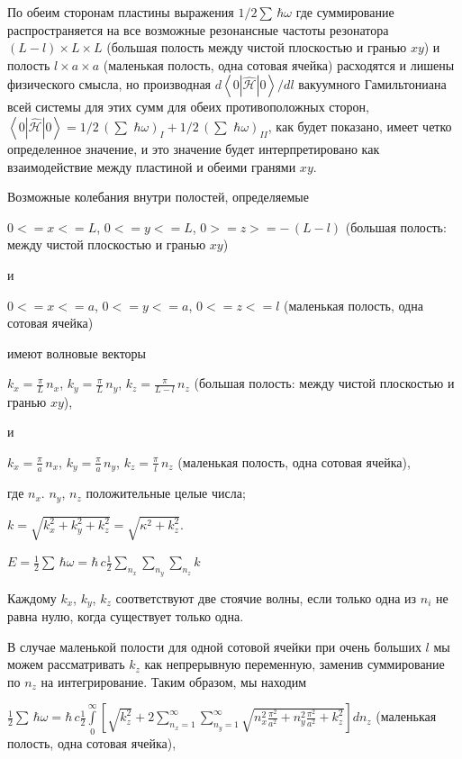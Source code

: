 \documentclass[11pt]{article}
\begin{document}
По обеим сторонам пластины выражения \(1\big/2\sum\,\hbar\omega\) где
суммирование распространяется на все возможные резонансные частоты
резонатора \(\left(L-l\right)\times L\times L\) (большая полость между
чистой плоскостью и гранью \(xy\)) и полость \(l\times a\times a\)
(маленькая полость, одна сотовая ячейка) расходятся и лишены физического
смысла, но производная
\({d\left<0|\hat {\mathcal{H}}|0\right>}\big/{dl}\) вакуумного
Гамильтониана всей системы для этих сумм для обеих противоположных
сторон,
\(\left<0|\hat{\mathcal{H}}|0\right> = 1\big/2\,\left(\sum\,\,\hbar\omega\right)_{I} + 1\big/2\,\left(\sum\,\,\hbar\omega\right)_{II}\),
как будет показано, имеет четко определенное значение, и это значение
будет интерпретировано как взаимодействие между пластиной и обеими
гранями \(xy\).

    Возможные колебания внутри полостей, определяемые

\(0<=x<=L\), \(0<=y<=L\), \(0>=z>=-\,(L-l)\) (большая полость: между
чистой плоскостью и гранью \(xy\))

и

\(0<=x<=a\), \(0<=y<=a\), \(0<=z<=l\) (маленькая полость, одна сотовая
ячейка)

    имеют волновые векторы

\(k_x = \frac{\pi}{L}\,n_x\), \(k_y = \frac{\pi}{L}\,n_y\),
\(k_z = \frac{\pi}{L-l}\,n_z\) (большая полость: между чистой плоскостью
и гранью \(xy\)),

и

\(k_x = \frac{\pi}{a}\,n_x\), \(k_y = \frac{\pi}{a}\,n_y\),
\(k_z = \frac{\pi}{l}\,n_z\) (маленькая полость, одна сотовая ячейка),

где \(n_x\). \(n_y\), \(n_z\) положительные целые числа;

\(k = \sqrt{k_x^2+k_y^2+k_z^2} = \sqrt{\kappa^2+k_z^2}\).

\(E = \frac{1}{2}\sum\,\hbar\omega = \hbar\,c\frac{1}{2}\sum\limits_{n_x}^{}\sum\limits_{n_y}^{}\sum\limits_{n_z}^{}k\)

    Каждому \(k_x\), \(k_y\), \(k_z\) соответствуют две стоячие волны, если
только одна из \(n_i\) не равна нулю, когда существует только одна.

В случае маленькой полости для одной сотовой ячейки при очень больших
\(l\) мы можем рассматривать \(k_z\) как непрерывную переменную, заменив
суммирование по \(n_z\) на интегрирование. Таким образом, мы находим

\(\frac{1}{2}\sum\,\hbar\omega = \hbar\,c\frac{1}{2}\int\limits_{0}^{\infty}\left[{\sqrt{k_z^2}+2\sum\limits_{n_x=1}^{\infty}\sum\limits_{n_y=1}^{\infty}\sqrt{n_x^2\frac{\pi^2}{a^2}+n_y^2\frac{\pi^2}{a^2}+k_z^2}}\right]d{n_z}\)
(маленькая полость, одна сотовая ячейка),
\end{document}
